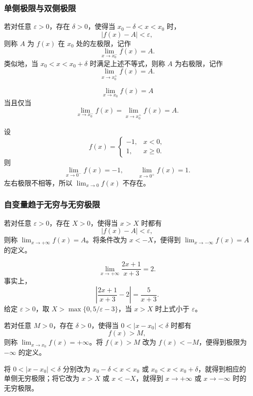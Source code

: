 \documentclass[fontset=fandol]{ctexart}
\begin{document}
\subsubsection*{单侧极限与双侧极限}

\begin{definition}[左极限与右极限]
若对任意 \(\varepsilon>0\)，存在 \(\delta>0\)，使得当 \(x_0-\delta<x<x_0\) 时，
\[
|f(x)-A|<\varepsilon,
\]
则称 \(A\) 为 \(f(x)\) 在 \(x_0\) 处的左极限，记作
\[
\lim_{x\to x_0^-}f(x)=A.
\]
类似地，当 \(x_0<x<x_0+\delta\) 时满足上述不等式，则称 \(A\) 为右极限，记作
\[
\lim_{x\to x_0^+}f(x)=A.
\]
\end{definition}

\begin{theorem}[双侧极限存在的充要条件]
\[
\lim_{x\to x_0}f(x)=A
\]
当且仅当
\[
\lim_{x\to x_0^-}f(x)=\lim_{x\to x_0^+}f(x)=A.
\]
\end{theorem}

\begin{example}[左右极限不相等]
设
\[
f(x)=
\begin{cases}
-1,&x<0,\\
1,&x\geq0.
\end{cases}
\]
则
\[
\lim_{x\to0^-}f(x)=-1,\qquad
\lim_{x\to0^+}f(x)=1.
\]
左右极限不相等，所以 \(\lim_{x\to0}f(x)\) 不存在。
\end{example}

\subsubsection*{自变量趋于无穷与无穷极限}

\begin{definition}[自变量趋于无穷时的有限极限]
若对任意 \(\varepsilon>0\)，存在 \(X>0\)，使得当 \(x>X\) 时都有
\[
|f(x)-A|<\varepsilon,
\]
则称 \(\lim_{x\to+\infty}f(x)=A\)。将条件改为 \(x<-X\)，便得到 \(\lim_{x\to-\infty}f(x)=A\) 的定义。
\end{definition}

\begin{example}
\[
\lim_{x\to+\infty}\frac{2x+1}{x+3}=2.
\]
事实上，
\[
\left|\frac{2x+1}{x+3}-2\right|=\frac5{x+3}.
\]
给定 \(\varepsilon>0\)，取 \(X>\max\{0,5/\varepsilon-3\}\)，当 \(x>X\) 时上式小于 \(\varepsilon\)。
\end{example}

\begin{definition}[无穷极限]
若对任意 \(M>0\)，存在 \(\delta>0\)，使得当 \(0<|x-x_0|<\delta\) 时都有
\[
f(x)>M,
\]
则称 \(\lim_{x\to x_0}f(x)=+\infty\)。将 \(f(x)>M\) 改为 \(f(x)<-M\)，便得到极限为 \(-\infty\) 的定义。

将 \(0<|x-x_0|<\delta\) 分别改为 \(x_0-\delta<x<x_0\) 或 \(x_0<x<x_0+\delta\)，就得到相应的单侧无穷极限；将它改为 \(x>X\) 或 \(x<-X\)，就得到 \(x\to+\infty\) 或 \(x\to-\infty\) 时的无穷极限。
\end{definition}
\end{document}
